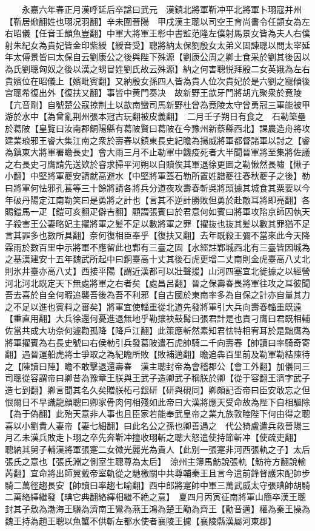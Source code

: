 　　永嘉六年春正月漢呼延后卒諡曰武元　漢鎮北將軍靳冲平北將軍卜珝寇并州【靳居焮翻姓也珝况羽翻】辛未圍晉陽　甲戌漢主聰以司空王育尚書令任顗女為左右昭儀【任音壬顗魚豈翻】中軍大將軍王彰中書監范隆左僕射馬景女皆為夫人右僕射朱紀女為貴妃皆金印紫綬【綬音受】聰將納太保劉殷女太弟义固諫聰以問太宰延年太傅景皆曰太保自云劉康公之後與陛下殊源【劉康公周之卿士食采於劉其後因以為氏劉聰匈奴之後以漢之甥冒姓劉氏故云殊源】納之何害聰悦拜殷二女英娥為左右貴嬪位在昭儀上【嬪毗賓翻】又納殷女孫四人皆為貴人位次貴妃於是六劉之寵傾後宫聰希復出外【復扶又翻】事皆中黄門奏决　故新野王歆牙門將胡亢聚衆於竟陵【亢音剛】自號楚公寇掠荆土以歆南蠻司馬新野杜曾為竟陵太守曾勇冠三軍能被甲游於水中【為曾亂荆州張本冠古玩翻被皮義翻】　二月壬子朔日有食之　石勒築壘於葛陂【皇覽曰汝南郡鮦陽縣有葛陂賢曰葛陂在今豫州新蔡縣西北】課農造舟將攻建業琅邪王睿大集江南之衆於壽春以鎮東長史紀瞻為揚威將軍都督諸軍以討之【睿為鎮東大將軍署瞻長史】會大雨三月不止勒軍中饑疫死者大半聞晉軍將至集將佐議之右長史刁膺請先送欵於睿求掃平河朔以自贖俟其軍退徐更圖之勒愀然長嘯【愀子小翻】中堅將軍夔安請就高避水【中堅將軍蓋石勒所置姓譜夔往春秋夔子之後】勒曰將軍何怯邪孔萇等三十餘將請各將兵分道夜攻壽春斬吳將頭據其城食其粟要以今年破丹陽定江南勒笑曰是勇將之計也【言其不逆計勝敗但勇於赴敵耳將即亮翻】各賜鎧馬一疋【鎧可亥翻疋僻吉翻】顧謂張賓曰於君意何如賓曰將軍攻陷京師囚執天子殺害王公妻略妃主擢將軍之髪不足以數將軍之罪【擢抜也抜其髪以數其罪猶不足言其罪多也數所具翻】奈何復相臣奉乎【復扶又翻】去年既殺王彌不當來此今天降霖雨於數百里中示將軍不應留此也鄴有三臺之固【水經註鄴城西北有三臺皆因城為之基漢建安十五年魏武所起中曰銅臺高十丈其後石虎更增二丈南則金虎臺高八丈北則氷井臺亦高八丈】西接平陽【謂近漢都可以壯聲援】山河四塞宜北徙據之以經營河北河北既定天下無處將軍之右者矣【處昌呂翻】晉之保壽春畏將軍往攻之耳彼聞吾去喜於自全何暇追襲吾後為吾不利邪【自古國於東南率多為自保之計亦自量其力之不足以進也賓料之審矣】將軍宜使輜重從北道先發將軍引大兵向壽春輜重既遠【重直用翻】大兵徐還何憂進退無地乎勒攘袂鼓髯曰張君計是也責刁膺曰君既相輔佐當共成大功奈何遽勸孤降【降戶江翻】此策應斬然素知君怯特相宥耳於是黜膺為將軍擢賓為右長史號曰右侯勒引兵發葛陂遣石虎帥騎二千向壽春【帥讀曰率騎奇寄翻】遇晉運船虎將士爭取之為紀瞻所敗【敗補邁翻】瞻追犇百里前及勒軍勒結陳待之【陳讀曰陣】瞻不敢擊退還壽春　漢主聰封帝為會稽郡公【會工外翻】加儀同三司聰從容謂帝曰卿昔為豫章王朕與王武子造卿武子稱朕於卿【從于容翻王濟字武子造七到翻】卿言聞其名久矣贈朕柘弓銀研【研與硯同】卿頗記否帝曰臣安敢忘之但恨爾日不早識龍顔聰曰卿家骨肉何相殘如此帝曰大漢將應天受命故為陛下自相驅除【為于偽翻】此殆天意非人事也且臣家若能奉武皇帝之業九族敦睦陛下何由得之聰喜以小劉貴人妻帝【妻七細翻】曰此名公之孫也卿善遇之　代公猗盧遣兵救晉陽三月乙未漢兵敗走卜珝之卒先奔靳冲擅收珝斬之聰大怒遣使持節斬冲【使疏吏翻】　聰納其舅子輔漢將軍張寔二女徽光麗光為貴人【此别一張寔非河西張軌之子】太后張氏之意也【張氏淵之側室生聰尊為太后】　涼州主簿馬魴說張軌【魴符方翻說輸芮翻】宜命將出師翼戴帝室軌從之馳檄關中共尊輔秦王且言今遣前鋒督護宋配帥步騎二萬徑趨長安【帥讀曰率趨七喻翻】西中郎將寔帥中軍三萬武威太守張琠帥胡騎二萬絡繹繼發【琠它典翻絡繹相繼不絶之意】　夏四月丙寅征南將軍山簡卒漢王聰封其子敷為渤海王驥為濟南王鸞為燕王鴻為楚王勱為齊王【勱音邁】權為秦王操為魏王持為趙王聰以魚蟹不供斬左都水使者襄陵王攄【襄陵縣漢屬河東郡】

